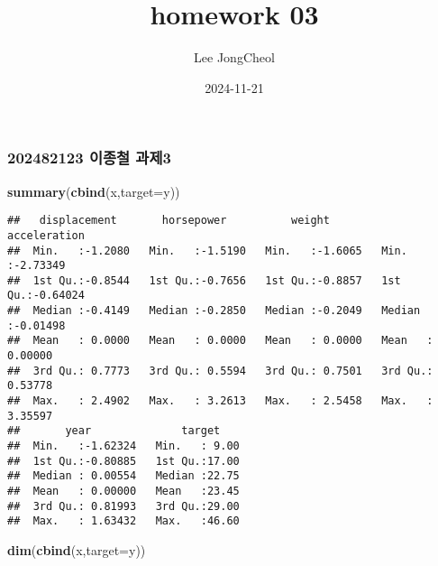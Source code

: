 \documentclass[
]{article}
\title{homework 03}
\author{Lee JongCheol}
\date{2024-11-21}
\newenvironment{Shaded}{\begin{snugshade}}{\end{snugshade}}
\newcommand{\AttributeTok}[1]{\textcolor[rgb]{0.13,0.29,0.53}{#1}}
\newcommand{\DecValTok}[1]{\textcolor[rgb]{0.00,0.00,0.81}{#1}}
\newcommand{\FunctionTok}[1]{\textcolor[rgb]{0.13,0.29,0.53}{\textbf{#1}}}
\newcommand{\NormalTok}[1]{#1}
\newcommand{\OtherTok}[1]{\textcolor[rgb]{0.56,0.35,0.01}{#1}}
\newcommand{\SpecialCharTok}[1]{\textcolor[rgb]{0.81,0.36,0.00}{\textbf{#1}}}
\begin{document}
\maketitle

\subsubsection{202482123 이종철
과제3}\label{uxc774uxc885uxcca0-uxacfcuxc81c3}

\begin{Shaded}
\end{Shaded}

\begin{Shaded}
\begin{Highlighting}[]
\FunctionTok{summary}\NormalTok{(}\FunctionTok{cbind}\NormalTok{(x,}\AttributeTok{target=}\NormalTok{y))}
\end{Highlighting}
\end{Shaded}

\begin{verbatim}
##   displacement       horsepower          weight         acceleration     
##  Min.   :-1.2080   Min.   :-1.5190   Min.   :-1.6065   Min.   :-2.73349  
##  1st Qu.:-0.8544   1st Qu.:-0.7656   1st Qu.:-0.8857   1st Qu.:-0.64024  
##  Median :-0.4149   Median :-0.2850   Median :-0.2049   Median :-0.01498  
##  Mean   : 0.0000   Mean   : 0.0000   Mean   : 0.0000   Mean   : 0.00000  
##  3rd Qu.: 0.7773   3rd Qu.: 0.5594   3rd Qu.: 0.7501   3rd Qu.: 0.53778  
##  Max.   : 2.4902   Max.   : 3.2613   Max.   : 2.5458   Max.   : 3.35597  
##       year              target     
##  Min.   :-1.62324   Min.   : 9.00  
##  1st Qu.:-0.80885   1st Qu.:17.00  
##  Median : 0.00554   Median :22.75  
##  Mean   : 0.00000   Mean   :23.45  
##  3rd Qu.: 0.81993   3rd Qu.:29.00  
##  Max.   : 1.63432   Max.   :46.60
\end{verbatim}

\begin{Shaded}
\begin{Highlighting}[]
\FunctionTok{dim}\NormalTok{(}\FunctionTok{cbind}\NormalTok{(x,}\AttributeTok{target=}\NormalTok{y))}
\end{Highlighting}
\end{Shaded}
\end{document}
